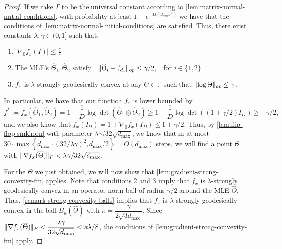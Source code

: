 \documentclass[aos]{imsart}
\theoremstyle{definition}
\numberwithin{equation}{section}
\DeclarePairedDelimiter{\norm}{\lVert}{\rVert}
\newcommand{\otheta}{\overline{\Theta}}
\newcommand{\htheta}{\widehat{\Theta}}
\newcommand{\SPD}{\mathbb{P}}
\def\dmin{d_{\min}}
\def\dmax{d_{\max}}
\newcommand{\CF}[1]{{\color{purple}[CF: #1]}}
\begin{document}
\begin{proof}
If we take $\Gamma$ to be the universal constant according to \cref{lem:matrix-normal-initial-conditions}, with probability at least $1 - e^{- \Omega(\dmin \varepsilon^2)}$ we have that the conditions of \cref{lem:matrix-normal-initial-conditions} are satisfied.
Thus, there exist constants $\lambda, \gamma \in (0, 1]$ such that:
\begin{enumerate}
	\item $|\nabla_0 f_x(I)| \leq \frac{\gamma}{2}$
	\item The MLE's $\htheta_1, \htheta_2$ satisfy $\ \ \norm{\htheta_i - I_{d_i}}_{op} \leq \gamma/2, \ \ $ for $i \in \{1,2\}$
	\item $f_x$ is $\lambda$-strongly geodesically convex at any $\Theta \in \SPD$ such that $\norm{\log \Theta}_{op} \leq \gamma$.
\end{enumerate}
In particular, we have that our function $f_x$ is lower bounded by 
$$f^* := f_x(\htheta_1, \htheta_2) = 1 - \dfrac{1}{D} \log\det(\htheta_1 \otimes \htheta_2) \geq 1 - \dfrac{1}{D} \log\det((1+\gamma/2) I_D) \geq - \gamma/2,  $$
and we also know that $f_x(I_D) = 1 + \nabla_0 f_x(I_D) \leq 1 + \gamma/2$. Thus, by \cref{lem:flip-flop-sinkhorn} with parameter $\lambda \gamma/32 \sqrt{\dmax}$, we know that in at most 
$30  \cdot \max\left\{ \dmax \cdot \left(32/\lambda \gamma\right)^2, \dmax/2 \right\} = O(\dmax)$ steps, we will find a point $\otheta$ with $\norm{\nabla f_x(\otheta)}_F < \lambda \gamma /32 \sqrt{\dmax}$. 

For the $\otheta$ we just obtained, we will now show that \cref{lem:gradient-strong-convexity-fm} applies. 
Note that conditions 2 and 3 imply that $f_x$ is $\lambda$-strongly geodesically convex in an operator norm ball of radius $\gamma/2$ around the MLE $\htheta$.
Thus, \cref{remark-strong-convexity-balls} implies that $f_x$ is $\lambda$-strongly geodesically convex in the ball $B_\kappa(\htheta)$ with $\kappa = \dfrac{\gamma}{2\sqrt{3\dmax}}$.   
Since $\norm{\nabla f_x(\otheta)}_F < \dfrac{\lambda \gamma}{32 \sqrt{\dmax}} < \kappa \lambda/8$, the conditions of \cref{lem:gradient-strong-convexity-fm} apply.


\end{proof}
\end{document}
